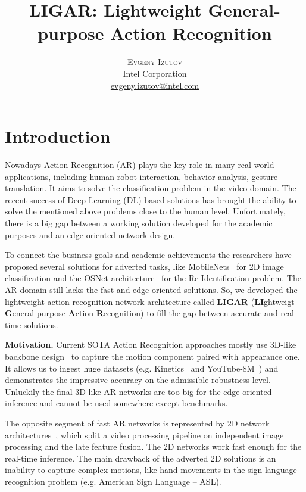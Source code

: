 \documentclass[twoside, twocolumn]{article}
\title{LIGAR: Lightweight General-purpose Action Recognition}
\author{
\textsc{Evgeny Izutov} \\[1ex]
\normalsize Intel Corporation \\
\normalsize \href{mailto:evgeny.izutov@intel.com}{evgeny.izutov@intel.com}
}
\date{}
\begin{document}
\maketitle



\section{Introduction}

\lettrine[nindent=0em,lines=3]{N}{}owadays Action Recognition (AR) plays the key role in many real-world applications,
including human-robot interaction, behavior analysis, gesture translation. It aims to solve the classification problem
in the video domain. The recent success of Deep Learning (DL) based solutions has brought the ability to solve the
mentioned above problems close to the human level. Unfortunately, there is a big gap between a working solution developed
for the academic purposes and an edge-oriented network design.

To connect the business goals and academic achievements the researchers have proposed several solutions for adverted
tasks, like MobileNets~\cite{MN-V1, MN-V2, MN-V3} for 2D image classification and the OSNet architecture~\cite{OSNet}
for the Re-Identification problem. The AR domain still lacks the fast and edge-oriented solutions. So, we developed the
lightweight action recognition network architecture called \textbf{LIGAR} (\textbf{LI}ghtweigt  
\textbf{G}eneral-purpose \textbf{A}ction \textbf{R}ecognition) to fill the gap between accurate and real-time solutions.

\textbf{Motivation.} Current SOTA Action Recognition approaches mostly use 3D-like backbone design~\cite{I3D, P3D,
R(2+1)D, S3D, X3D} to capture the motion component paired with appearance one. It allows us to ingest huge datasets
(e.g. Kinetics~\cite{Kinetics} and YouTube-8M~\cite{Ytb8m}) and demonstrates the impressive accuracy on the admissible
robustness level. Unluckily the final 3D-like AR networks are too big for the edge-oriented inference and cannot
be used somewhere except benchmarks.

The opposite segment of fast AR networks is represented by 2D network architectures~\cite{TSN, TSM, TRN}, which split
a video processing pipeline on independent image processing and the late feature fusion. The 2D networks work fast
enough for the real-time inference. The main drawback of the adverted 2D solutions is an inability to capture complex
motions, like hand movements in the sign language recognition problem (e.g. American Sign Language -- ASL).
\end{document}

